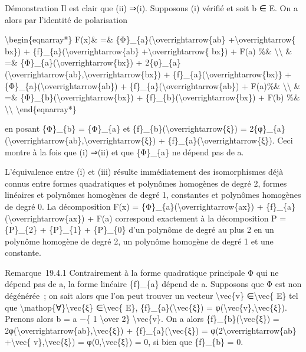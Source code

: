 \documentclass[]{article}
\begin{document}
Démonstration Il est clair que (ii) ⇒(i). Supposons (i) vérifié et soit
b ∈ E. On a alors par l'identité de polarisation

\textbackslash{}begin\{eqnarray*\} F(x)\& =\&
\{Φ\}\_\{a\}(\textbackslash{}overrightarrow\{ab\}
+\textbackslash{}overrightarrow\{ bx\}) +
\{f\}\_\{a\}(\textbackslash{}overrightarrow\{ab\}
+\textbackslash{}overrightarrow\{ bx\}) + F(a) \%\&
\textbackslash{}\textbackslash{} \& =\&
\{Φ\}\_\{a\}(\textbackslash{}overrightarrow\{bx\}) +
2\{φ\}\_\{a\}(\textbackslash{}overrightarrow\{ab\},\textbackslash{}overrightarrow\{bx\})
+ \{f\}\_\{a\}(\textbackslash{}overrightarrow\{bx)\} +
\{Φ\}\_\{a\}(\textbackslash{}overrightarrow\{ab\}) +
\{f\}\_\{a\}(\textbackslash{}overrightarrow\{ab\}) + F(a)\%\&
\textbackslash{}\textbackslash{} \& =\&
\{Φ\}\_\{b\}(\textbackslash{}overrightarrow\{bx\}) +
\{f\}\_\{b\}(\textbackslash{}overrightarrow\{bx\}) + F(b) \%\&
\textbackslash{}\textbackslash{} \textbackslash{}end\{eqnarray*\}

en posant \{Φ\}\_\{b\} = \{Φ\}\_\{a\} et
\{f\}\_\{b\}(\textbackslash{}overrightarrow\{ξ\}) =
2\{φ\}\_\{a\}(\textbackslash{}overrightarrow\{ab\},\textbackslash{}overrightarrow\{ξ\})
+ \{f\}\_\{a\}(\textbackslash{}overrightarrow\{ξ\}). Ceci montre à la
fois que (i) ⇒(ii) et que \{Φ\}\_\{a\} ne dépend pas de a.

L'équivalence entre (i) et (iii) résulte immédiatement des isomorphismes
déjà connus entre formes quadratiques et polynômes homogènes de degré 2,
formes linéaires et polynômes homogènes de degré 1, constantes et
polynômes homogènes de degré 0. La décomposition F(x) =
\{Φ\}\_\{a\}(\textbackslash{}overrightarrow\{ax\}) +
\{f\}\_\{a\}(\textbackslash{}overrightarrow\{ax\}) + F(a) correspond
exactement à la décomposition P = \{P\}\_\{2\} + \{P\}\_\{1\} +
\{P\}\_\{0\} d'un polynôme de degré au plus 2 en un polynôme homogène de
degré 2, un polynôme homogène de degré 1 et une constante.

Remarque~19.4.1 Contrairement à la forme quadratique principale Φ qui ne
dépend pas de a, la forme linéaire \{f\}\_\{a\} dépend de a. Supposons
que Φ est non dégénérée~; on sait alors que l'on peut trouver un vecteur
\textbackslash{}vec\{v\} ∈\textbackslash{}vec\{ E\} tel que
\textbackslash{}mathop\{∀\}\textbackslash{}vec\{ξ\}
∈\textbackslash{}vec\{ E\}, \{f\}\_\{a\}(\textbackslash{}vec\{ξ\}) =
φ(\textbackslash{}vec\{v\},\textbackslash{}vec\{ξ\}). Prenons alors b =
a −\{ 1 \textbackslash{}over 2\} \textbackslash{}vec\{v\}. On a alors
\{f\}\_\{b\}(\textbackslash{}vec\{ξ\}) =
2φ(\textbackslash{}overrightarrow\{ab\},\textbackslash{}vec\{ξ\}) +
\{f\}\_\{a\}(\textbackslash{}vec\{ξ\}) =
φ(2\textbackslash{}overrightarrow\{ab\} +\textbackslash{}vec\{
v\},\textbackslash{}vec\{ξ\}) = φ(0,\textbackslash{}vec\{ξ\}) = 0, si
bien que \{f\}\_\{b\} = 0.
\end{document}
